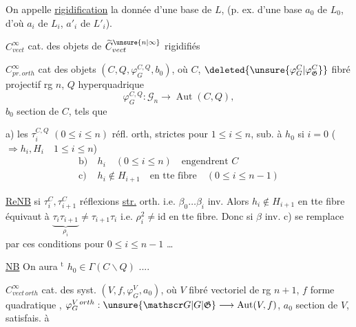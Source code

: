 On appelle \uline{rigidification} la donnée d'une base de $L$, (p. ex. d'une base $a_0$ de $L_0$, d'où $a_i$ de $L_i$, $a'_i$ de $L'_i$).

$C^\infty_{vect}$ cat. des objets de $\widetilde C^{\unsure{n|\infty}}_{vect}$ rigidifiés

$C^\infty_{pr.\,orth}$ cat des objets $(C,Q,\varphi_G^{C,Q},b_0)$, où $C$, $\deleted{\unsure{\varphi_G^C|\varphi_{\mathfrak G}^C}}$ fibré projectif rg $n$, $Q$ hyper\inserted{$\unsure{\infty}$}quadrique 
\[
\varphi_G^{C,Q}:\mathscr G_n\longrightarrow\operatorname{Aut}(C,Q),
\]
$b_0$ section de $C$, tels que

a) les $\tau_i^{C,Q}$ $(0\leq i\leq n)$ réfl. orth, strictes pour $1\leq i\leq n$, sub. à $h_0$ si $i=0$ ($\Rightarrow h_i,H_i\quad1\leq i\leq n$)
\[
\begin{aligned}
\text{b)}\ &h_i\quad (0\leq i\leq n)\quad\text{engendrent }C\\
\text{c)}\ &h_i\notin H_{i+1}\quad\text{en tte fibre}\quad(0\leq i\leq n-1)
\end{aligned}
\]

\uline{ReNB} si $\tau_i^C,\tau_{i+1}^C$ réflexions \uline{str.} orth. i.e. $\beta_0\ldots\beta_i$ inv. Alors $h_i\notin H_{i+1}$ en tte fibre équivaut à $\underbrace{\tau_i\tau_{i+1}}_{\rho_i}\ne\tau_{i+1}\tau_i$  i.e. $\rho_i^2\ne\mathrm{id}$ en tte fibre. Donc si $\beta$ inv. c) se remplace par ces conditions pour $0\leq i\leq n-1$ \ldots


\uline{ NB} On aura $^{\mathrm t}$ $h_0\in\Gamma(C\smallsetminus Q)$ ....

$C^\infty_{vect\,orth}$ cat. des syst. $(V,f,\varphi_G^V,a_0)$, où $V$ fibré vectoriel de rg $n+1$, $f$ forme quadratique , $\varphi_G^{V\,orth}:\unsure{\mathscr G|G|\mathfrak G}\longrightarrow\operatorname{Aut}(V,f)$, $a_0$ section de $V$, satisfais. à

